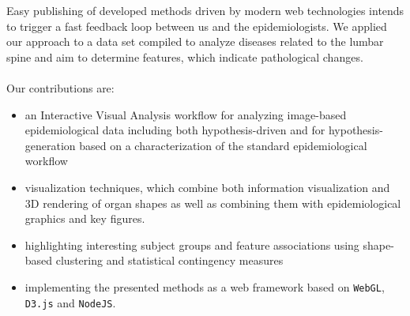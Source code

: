 \documentclass[journal]{style/vgtc} 			          %
\begin{document}
%
Easy publishing of developed methods driven by modern web technologies intends to trigger a fast feedback loop between us and the epidemiologists.
We applied our approach to a data set compiled to analyze diseases related to the lumbar spine and aim to determine features, which indicate pathological changes.
\\\\
Our contributions are:
\begin{itemize}
	\item an Interactive Visual Analysis workflow for analyzing image-based epidemiological data including both hypothesis-driven and for hypothesis-generation based on a characterization of the standard epidemiological workflow
	\item visualization techniques, which combine both information visualization and 3D rendering of organ shapes as well as combining them with epidemiological graphics and key figures.
	\item highlighting interesting subject groups and feature associations using shape-based clustering and statistical contingency measures
	\item implementing the presented methods as a web framework based on \texttt{WebGL}, \texttt{D3.js} and \texttt{NodeJS}.
\end{itemize}
\end{document}
